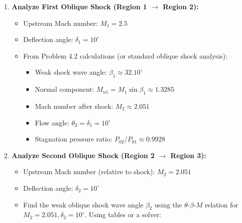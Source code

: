 \begin{enumerate}
\def\labelenumi{\arabic{enumi}.}
\tightlist
\item
  \textbf{Analyze First Oblique Shock (Region 1 \(\to\) Region 2):}

  \begin{itemize}
  \tightlist
  \item
    Upstream Mach number: \(M_1 = 2.5\)
  \item
    Deflection angle: \(\delta_1 = 10^\circ\)
  \item
    From Problem 4.2 calculations (or standard oblique shock analysis):

    \begin{itemize}
    \tightlist
    \item
      Weak shock wave angle: \(\beta_1 \approx 32.10^\circ\)
    \item
      Normal component: \(M_{n1} = M_1 \sin\beta_1 \approx 1.3285\)
    \item
      Mach number after shock: \(M_2 \approx 2.051\)
    \item
      Flow angle: \(\theta_2 = \delta_1 = 10^\circ\)
    \item
      Stagnation pressure ratio: \(P_{02}/P_{01} \approx 0.9928\)
    \end{itemize}
  \end{itemize}
\item
  \textbf{Analyze Second Oblique Shock (Region 2 \(\to\) Region 3):}

  \begin{itemize}
  \tightlist
  \item
    Upstream Mach number (relative to shock): \(M_2 = 2.051\)
  \item
    Deflection angle: \(\delta_2 = 10^\circ\)
  \item
    Find the weak oblique shock wave angle \(\beta_2\) using the
    \(\theta\)-\(\beta\)-\(M\) relation for
    \(M_2=2.051, \delta_2=10^\circ\). Using tables or a solver:


\end{itemize}
\end{enumerate}

